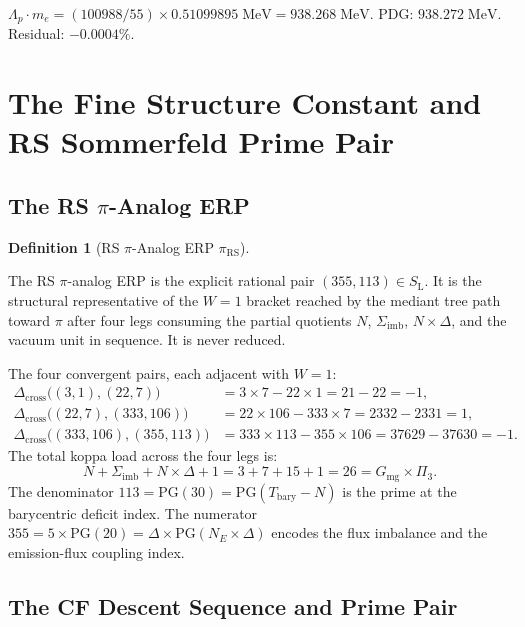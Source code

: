 \documentclass[11pt,letterpaper]{article}
\theoremstyle{plain}
\theoremstyle{definition}
\newtheorem{definition}[theorem]{Definition}
\theoremstyle{remark}
\newcommand{\SL}{S_{\mathrm{L}}}
\newcommand{\Dcross}{\Delta_{\mathrm{cross}}}
\newcommand{\Tbary}{T_{\mathrm{bary}}}
\newcommand{\Sigimb}{\Sigma_{\mathrm{imb}}}
\newcommand{\PG}{\mathrm{PG}}
\newcommand{\Gmg}{G_{\mathrm{mg}}}
\newcommand{\Pithree}{\Pi_3}
\newcommand{\piRS}{\pi_{\mathrm{RS}}}
\newcommand{\Lambdap}{\Lambda_p}
\begin{document}
\begin{verifybox}
$\Lambdap\cdot m_e = (100988/55)\times0.51099895\;\mathrm{MeV} = 938.268\;\mathrm{MeV}$.
PDG: $938.272\;\mathrm{MeV}$. Residual: $-0.0004\%$.
\end{verifybox}

\section{The Fine Structure Constant and RS Sommerfeld
Prime Pair}\label{sec:alpha}

\subsection{The RS $\pi$-Analog ERP}

\begin{definition}[RS $\pi$-Analog ERP $\piRS$]\label{def:pi-analog}
\begin{rsbox}
The RS $\pi$-analog ERP is the explicit rational pair $(355,113)
\in\SL$.  It is the structural representative of the $W=1$ bracket
reached by the mediant tree path toward $\pi$ after four legs
consuming the partial quotients $N$, $\Sigimb$, $N\times\Delta$,
and the vacuum unit in sequence.  It is never reduced.

The four convergent pairs, each adjacent with $W=1$:
\begin{align*}
\Dcross\!\bigl((3,1),(22,7)\bigr)
  &=3\times7-22\times1=21-22=-1,\\
\Dcross\!\bigl((22,7),(333,106)\bigr)
  &=22\times106-333\times7=2332-2331=1,\\
\Dcross\!\bigl((333,106),(355,113)\bigr)
  &=333\times113-355\times106=37629-37630=-1.
\end{align*}
The total koppa load across the four legs is:
\[
N+\Sigimb+N\times\Delta+1=3+7+15+1=26=\Gmg\times\Pithree.
\]
The denominator $113=\PG(30)=\PG(\Tbary-N)$ is the prime at the
barycentric deficit index.  The numerator $355=5\times\PG(20)
=\Delta\times\PG(N_E\times\Delta)$ encodes the flux imbalance and
the emission-flux coupling index.
\end{rsbox}
\end{definition}

\subsection{The CF Descent Sequence and Prime Pair}
\end{document}

